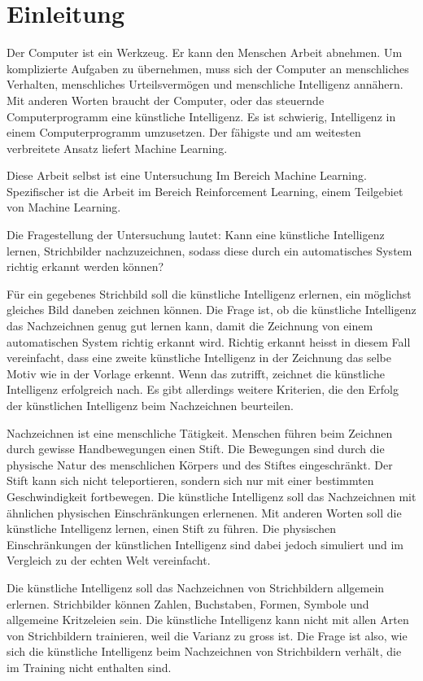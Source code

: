 \chapter{Einleitung}
Der Computer ist ein Werkzeug. Er kann den Menschen Arbeit abnehmen. Um
komplizierte Aufgaben zu übernehmen, muss sich der Computer an menschliches
Verhalten, menschliches Urteilsvermögen und menschliche Intelligenz annähern.
Mit anderen Worten braucht der Computer, oder das steuernde Computerprogramm
eine künstliche Intelligenz. Es ist schwierig, Intelligenz in einem
Computerprogramm umzusetzen. Der fähigste und am weitesten verbreitete Ansatz
liefert Machine Learning. 

Diese Arbeit selbst ist eine Untersuchung Im Bereich Machine Learning.
Spezifischer ist die Arbeit im Bereich Reinforcement Learning, einem Teilgebiet
von Machine Learning.

Die Fragestellung der Untersuchung lautet: Kann eine künstliche Intelligenz
lernen, Strichbilder nachzuzeichnen, sodass diese durch ein automatisches System
richtig erkannt werden können?

Für ein gegebenes Strichbild soll die künstliche Intelligenz erlernen, ein
möglichst gleiches Bild daneben zeichnen können. Die Frage ist, ob die
künstliche Intelligenz das Nachzeichnen genug gut lernen kann, damit die
Zeichnung von einem automatischen System richtig erkannt wird. Richtig erkannt
heisst in diesem Fall vereinfacht, dass eine zweite künstliche Intelligenz in
der Zeichnung das selbe Motiv wie in der Vorlage erkennt. Wenn das zutrifft,
zeichnet die künstliche Intelligenz erfolgreich nach. Es gibt allerdings
weitere Kriterien, die den Erfolg der künstlichen Intelligenz beim
Nachzeichnen beurteilen.

Nachzeichnen ist eine menschliche Tätigkeit. Menschen führen beim Zeichnen
durch gewisse Handbewegungen einen Stift. Die Bewegungen sind durch die
physische Natur des menschlichen Körpers und des Stiftes eingeschränkt. Der
Stift kann sich nicht teleportieren, sondern sich nur mit einer bestimmten
Geschwindigkeit fortbewegen. Die künstliche Intelligenz soll das Nachzeichnen
mit ähnlichen physischen Einschränkungen erlernenen. Mit anderen Worten soll
die künstliche Intelligenz lernen, einen Stift zu führen.  Die physischen
Einschränkungen der künstlichen Intelligenz sind dabei jedoch simuliert und im
Vergleich zu der echten Welt vereinfacht. 

Die künstliche Intelligenz soll das Nachzeichnen von Strichbildern allgemein
erlernen. Strichbilder können Zahlen, Buchstaben, Formen, Symbole und
allgemeine Kritzeleien sein. Die künstliche Intelligenz kann nicht mit allen
Arten von Strichbildern trainieren, weil die Varianz zu gross ist. Die Frage
ist also, wie sich die künstliche Intelligenz beim Nachzeichnen von
Strichbildern verhält, die im Training nicht enthalten sind.

